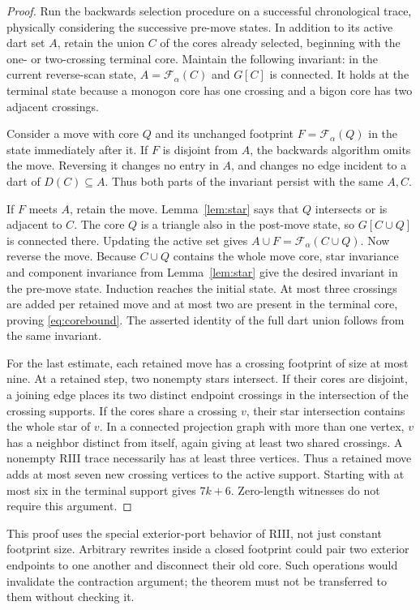 \documentclass[11pt]{article}
\theoremstyle{definition}
\begin{document}
\begin{proof}
Run the backwards selection procedure on a successful chronological
trace, physically considering the successive pre-move states. In
addition to its active dart set $A$, retain the union $C$ of the cores
already selected, beginning with the one- or two-crossing terminal core.
Maintain the following invariant: in the current reverse-scan state,
$A=\mathcal F_\alpha(C)$ and $G[C]$ is connected. It holds at the terminal
state because a monogon core has one crossing and a bigon core has two
adjacent crossings.

Consider a move with core $Q$ and its unchanged footprint
$F=\mathcal F_\alpha(Q)$ in the state immediately after it. If $F$ is
disjoint from $A$, the backwards algorithm omits the move. Reversing it
changes no entry in $A$, and changes no edge incident to a dart of
$D(C)\subseteq A$. Thus both parts of the invariant persist with the
same $A,C$.

If $F$ meets $A$, retain the move. Lemma~\ref{lem:star} says that $Q$
intersects or is adjacent to $C$. The core $Q$ is a triangle also in the
post-move state, so $G[C\cup Q]$ is connected there. Updating the active
set gives
$A\cup F=\mathcal F_\alpha(C\cup Q)$. Now reverse the move. Because
$C\cup Q$ contains the whole move core, star invariance and component
invariance from Lemma~\ref{lem:star} give the desired invariant in the
pre-move state. Induction reaches the initial state. At most three
crossings are added per retained move and at most two are present in
the terminal core, proving \eqref{eq:corebound}. The asserted identity
of the full dart union follows from the same invariant.

For the last estimate, each retained move has a crossing footprint of
size at most nine. At a retained step, two nonempty stars intersect. If
their cores are disjoint, a joining edge places its two distinct endpoint
crossings in the intersection of the crossing supports. If the cores
share a crossing $v$, their star intersection contains the whole star
of $v$. In a connected projection graph with more than one vertex, $v$
has a neighbor distinct from itself, again giving at least two shared
crossings. A nonempty RIII trace necessarily has at least three vertices.
Thus a retained move adds at most seven new crossing vertices to the
active support. Starting with at most six in the terminal support gives
$7k+6$. Zero-length witnesses do not require this argument.
\end{proof}

This proof uses the special exterior-port behavior of RIII, not just
constant footprint size. Arbitrary rewrites inside a closed footprint
could pair two exterior endpoints to one another and disconnect their
old core. Such operations would invalidate the contraction argument;
the theorem must not be transferred to them without checking it.
\end{document}

